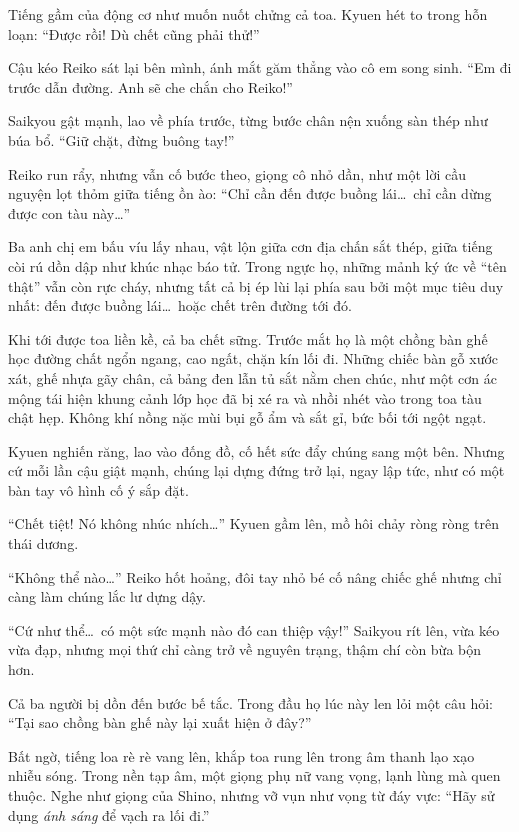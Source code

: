 \documentclass[../main.tex]{subfiles}
\begin{document}
Tiếng gầm của động cơ như muốn nuốt chửng cả toa. Kyuen hét to trong hỗn loạn: ``Được rồi! Dù chết cũng phải thử!''

Cậu kéo Reiko sát lại bên mình, ánh mắt găm thẳng vào cô em song sinh. ``Em đi trước dẫn đường. Anh sẽ che chắn cho Reiko!''

Saikyou gật mạnh, lao về phía trước, từng bước chân nện xuống sàn thép như búa bổ. ``Giữ chặt, đừng buông tay!''

Reiko run rẩy, nhưng vẫn cố bước theo, giọng cô nhỏ dần, như một lời cầu nguyện lọt thỏm giữa tiếng ồn ào: ``Chỉ cần đến được buồng lái\dots\ chỉ cần dừng được con tàu này\dots''

Ba anh chị em bấu víu lấy nhau, vật lộn giữa cơn địa chấn sắt thép, giữa tiếng còi rú dồn dập như khúc nhạc báo tử. Trong ngực họ, những mảnh ký ức về ``tên thật'' vẫn còn rực cháy, nhưng tất cả bị ép lùi lại phía sau bởi một mục tiêu duy nhất: đến được buồng lái\dots\ hoặc chết trên đường tới đó.

\ct

Khi tới được toa liền kề, cả ba chết sững. Trước mắt họ là một chồng bàn ghế học đường chất ngổn ngang, cao ngất, chặn kín lối đi. Những chiếc bàn gỗ xước xát, ghế nhựa gãy chân, cả bảng đen lẫn tủ sắt nằm chen chúc, như một cơn ác mộng tái hiện khung cảnh lớp học đã bị xé ra và nhồi nhét vào trong toa tàu chật hẹp. Không khí nồng nặc mùi bụi gỗ ẩm và sắt gỉ, bức bối tới ngột ngạt.

Kyuen nghiến răng, lao vào đống đồ, cố hết sức đẩy chúng sang một bên. Nhưng cứ mỗi lần cậu giật mạnh, chúng lại dựng đứng trở lại, ngay lập tức, như có một bàn tay vô hình cố ý sắp đặt.

``Chết tiệt! Nó không nhúc nhích\dots'' Kyuen gầm lên, mồ hôi chảy ròng ròng trên thái dương.

``Không thể nào\dots'' Reiko hốt hoảng, đôi tay nhỏ bé cố nâng chiếc ghế nhưng chỉ càng làm chúng lắc lư dựng dậy.

``Cứ như thể\dots\ có một sức mạnh nào đó can thiệp vậy!'' Saikyou rít lên, vừa kéo vừa đạp, nhưng mọi thứ chỉ càng trở về nguyên trạng, thậm chí còn bừa bộn hơn.

Cả ba người bị dồn đến bước bế tắc. Trong đầu họ lúc này len lỏi một câu hỏi: ``Tại sao chồng bàn ghế này lại xuất hiện ở đây?''

Bất ngờ, tiếng loa rè rè vang lên, khắp toa rung lên trong âm thanh lạo xạo nhiễu sóng. Trong nền tạp âm, một giọng phụ nữ vang vọng, lạnh lùng mà quen thuộc. Nghe như giọng của Shino, nhưng vỡ vụn như vọng từ đáy vực: ``Hãy sử dụng \emph{ánh sáng} để vạch ra lối đi.''
\end{document}
